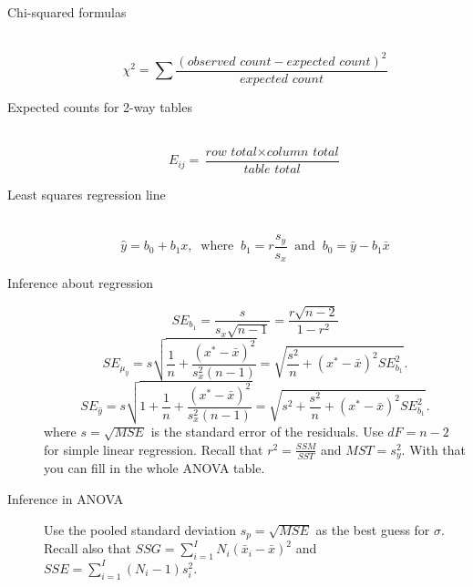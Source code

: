 \documentclass[11pt]{exam}
\newcommand{\ds}{\displaystyle}
\begin{document}
\begin{description}
\item[Chi-squared formulas] ~
$$\ds \chi^2 = \sum \frac{(\textit{observed count}-\textit{expected count})^2}{\textit{expected count}}$$ 

\item[Expected counts for 2-way tables] ~ 
$$E_{ij} = \frac{\textit{row total} \times \textit{column total}}{\textit{table total}}$$ 

\item[Least squares regression line] ~
$$\hat{y} = b_0+b_1 x, ~\text{  where  }~ b_1 = r \frac{s_y}{s_x} ~\text{  and  }~ b_0 = \bar{y} - b_1 \bar{x}$$

\item[Inference about regression] 
$$SE_{b_1} = \frac{s}{s_x \sqrt{n - 1}} = \frac{r \sqrt{n-2}}{1-r^2}$$ 
$$SE_{\mu_y} = s \sqrt{\frac{1}{n} + \frac{(x^* - \bar{x})^2}{s_x^2 (n-1)}} = \sqrt{\frac{s^2}{n} + (x^* - \bar{x})^2 SE_{b_1}^2}.$$
$$SE_{\hat{y}} = s \sqrt{1 + \frac{1}{n} + \frac{(x^* - \bar{x})^2}{s_x^2 (n-1)}} = \sqrt{s^2 + \frac{s^2}{n} + (x^* - \bar{x})^2 SE_{b_1}^2}.$$
where $s = \sqrt{MSE}$ is the standard error of the residuals. Use $dF = n - 2$ for simple linear regression.
Recall that $r^2 = \frac{SSM}{SST}$ and $MST = s_y^2$. With that you can fill in the whole ANOVA table.\\


\item[Inference in ANOVA] Use the pooled standard deviation $s_p = \sqrt{MSE}$ as the best guess for $\sigma$.   
Recall also that $SSG = \sum_{i = 1}^I N_i (\bar{x}_i - \bar{x})^2$ and $SSE = \sum_{i = 1}^{I} (N_i-1) s_i^2$. \\


\end{description}
\end{document}
